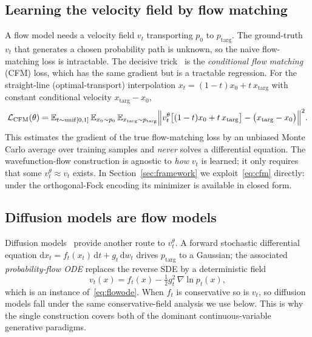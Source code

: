 \documentclass[11pt, a4paper]{article}
\newcommand{\Eblr}{\mathbb{E}}
\begin{document}
\subsection{Learning the velocity field by flow matching}

A flow model needs a velocity field $v_t$ transporting $p_0$ to
$p_{\mathrm{targ}}$. The ground-truth $v_t$ that generates a chosen probability
path is unknown, so the naive flow-matching loss is intractable. The decisive
trick~\cite{Layden2025} is the \emph{conditional flow matching} (CFM) loss,
which has the same gradient but is a tractable regression. For the
straight-line (optimal-transport) interpolation
$x_t=(1-t)x_0+t\,x_{\mathrm{targ}}$ with constant conditional velocity
$x_{\mathrm{targ}}-x_0$,
\begin{equation}
  \mathcal{L}_{\mathrm{CFM}}(\theta)=
  \Eblr_{t\sim\mathrm{unif}[0,1]}\,
  \Eblr_{x_0\sim p_0}\,
  \Eblr_{x_{\mathrm{targ}}\sim p_{\mathrm{targ}}}
  \Bigl\|v_t^\theta\bigl[(1-t)x_0+t\,x_{\mathrm{targ}}\bigr]
  -\bigl(x_{\mathrm{targ}}-x_0\bigr)\Bigr\|^2 .
  \label{eq:cfm}
\end{equation}
This estimates the gradient of the true flow-matching loss by an unbiased Monte
Carlo average over training samples and \emph{never} solves a differential
equation. The wavefunction-flow construction is agnostic to \emph{how} $v_t$ is
learned; it only requires that some $v_t^\theta\approx v_t$ exists. In
Section~\ref{sec:framework} we exploit~\eqref{eq:cfm} directly: under the
orthogonal-Fock encoding its minimizer is available in closed form.

\subsection{Diffusion models are flow models}

Diffusion models~\cite{Layden2025} provide another route to $v_t^\theta$. A
forward stochastic differential equation $\mathrm{d}x_t=f_t(x_t)\,\mathrm{d}t+
g_t\,\mathrm{d}w_t$ drives $p_{\mathrm{targ}}$ to a Gaussian; the associated
\emph{probability-flow ODE} replaces the reverse SDE by a deterministic field
\begin{equation}
  v_t(x)=f_t(x)-\tfrac12 g_t^2\,\nabla\ln p_t(x),
\end{equation}
which is an instance of~\eqref{eq:flowode}. When $f_t$ is conservative so is
$v_t$, so diffusion models fall under the same conservative-field analysis we
use below. This is why the single construction covers both of the dominant
continuous-variable generative paradigms.
\end{document}
